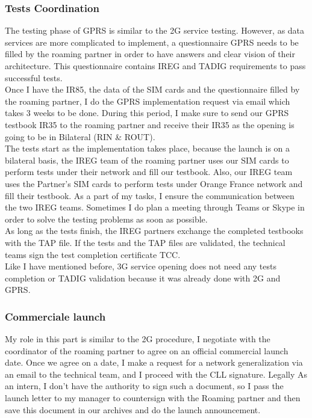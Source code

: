 \subsubsection{Tests Coordination}
\-\hspace{0.5cm} The testing phase of \acs{GPRS} is similar to the \acs{2G} service testing. However, as data services are more complicated to implement, a questionnaire \acs{GPRS} needs to be filled by the roaming partner in order to have answers and clear vision of their architecture. This questionnaire contains \acs{IREG} and \acs{TADIG} requirements to pass successful tests. \\

Once I have the IR85, the data of the \acs{SIM} cards and the questionnaire filled by the roaming partner, I do the \acs{GPRS} implementation request via email which takes 3 weeks to be done. During this period, I make sure to send our \acs{GPRS} testbook IR35 to the roaming partner and receive their IR35 as the opening is going to be in Bilateral (\acs{RIN} \& \acs{ROUT}).\\

The tests start as the implementation takes place, because the launch is on a bilateral basis, the \acs{IREG} team of the roaming partner uses our \acs{SIM} cards to perform tests under their network and fill our testbook. Also, our \acs{IREG} team uses the Partner’s \acs{SIM} cards to perform tests under Orange France network and fill their testbook. As a part of my tasks, I ensure the communication between the two \acs{IREG} teams. Sometimes I do plan a meeting through Teams or Skype in order to solve the testing problems as soon as possible.\\
	
As long as the tests finish, the \acs{IREG} partners exchange the completed testbooks with the \acs{TAP} file. If the tests and the \acs{TAP} files are validated, the technical teams sign the test completion certificate \acs{TCC}.\\

Like I have mentioned before, \acs{3G} service opening does not need any tests completion or \acs{TADIG} validation because it was already done with \acs{2G} and \acs{GPRS}.\\

\subsubsection{Commerciale launch}
\-\hspace{0.5cm} My role in this part is similar to the \acs{2G} procedure, I negotiate with the coordinator of the roaming partner to agree on an official commercial launch date. Once we agree on a date, I make a request for a network generalization via an email to the technical team, and I proceed with the \acs{CLL} signature. Legally As an intern, I don’t have the authority to sign such a document, so I pass the launch letter to my manager to countersign with the Roaming partner and then save this document in our archives and do the launch announcement.\\

